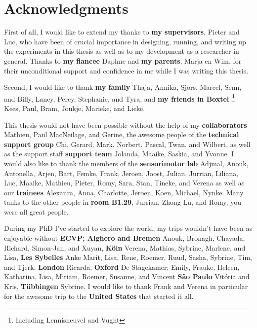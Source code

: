 \clearpage
\pagestyle{empty}

\chapter*{Acknowledgments}
{}

First of all, I would like to extend my thanks to \textbf{my supervisors}, Pieter and Luc, who have been of crucial importance in designing, running, and writing up the experiments in this thesis as well as to my development as a researcher in general. Thanks to \textbf{my fiancee} Daphne and \textbf{my parents}, Marja en Wim, for their unconditional support and confidence in me while I was writing this thesis.

Second, I would like to thank \textbf{my family} Thaja, Annika, Sjors, Marcel, Senn, and Billy, Lancy, Percy, Stephanie, and Tyra, and \textbf{my friends in Boxtel \footnote{Including Lennisheuvel and Vught}} Kees, Paul, Bram, Joukje, Marieke, and Lieke.


This thesis would not have been possible without the help of 
my \textbf{collaborators} Mathieu, Paul MacNeilage, and Gerine,
the awesome people of the
\textbf{technical support group} Chi, Gerard, Mark, Norbert, Pascal, Twan, and Wilbert,
as well as the support staff
\textbf{support team} Jolanda, Maaike, Saskia, and Yvonne.
I would also like to thank the members of the 
\textbf{sensorimotor lab} Adjmal, Anouk, Antonella, Arjen, Bart, Femke, Frank, Jeroen, Joost, Julian, Jurrian, Liliana, Luc, Maaike, Mathieu, Pieter, Romy, Sara, Stan, Tineke, and Verena 
as well as our 
\textbf{trainees} Alexanra, Anna, Charlotte, Jeroen, Koen, Michael, Nynke.
Many tanks to the other people in \textbf{room B1.29}, Jurrian, Zhong Lu, and Romy, you were all great people.


During my PhD I've started to explore the world, my trips wouldn't have been as enjoyable without 
\textbf{ECVP; Alghero and Bremen} Anouk, Bronagh, Chayada, Richard, Simon-Jan, and Xuyan,
\textbf{K\"oln} Verena, Mathias, Sybrine, Marlene, and Lisa,
\textbf{Les Sybelles} Anke Marit, Lisa, Rene, Roemer, Ruud, Sasha, Sybrine, Tim, and Tjerk.
\textbf{London} Ricarda,
\textbf{Oxford} De Stagekamer; Emily, Frauke, Heleen, Katharina, Lisa, Miriam, Roemer, Susanne, and Vincent
\textbf{S\~ao Paulo} Vit\'oria and Kris,
\textbf{T\"ubbingen} Sybrine.
I would like to thank Frank and Verena in particular for the awesome trip to the \textbf{United States} that started it all.


